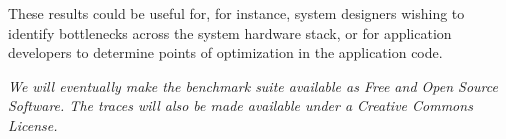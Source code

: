 \documentclass[portrait, a1]{KTHEEposter}
\begin{document}
\begin{pcolumns}[3]
\begin{pcolumn}[3]
\begin{pframe}[1.95]
                 These results could be useful for, for instance, system designers wishing to identify bottlenecks across the system hardware stack, or for application developers to determine points of optimization in the application code.
            \end{pframe}
            \begin{pframe}[.24]
                \itshape
                \smallskip
                We will eventually make the benchmark suite available as Free and Open Source Software.
                The traces will also be made available under a Creative Commons License.
            \end{pframe}    
            \begin{pframe**}[.81]
                \nocite{*}
                \small
                \printbibliography
            \end{pframe**}
        \end{pcolumn}
    \end{pcolumns}
    
\end{document}
